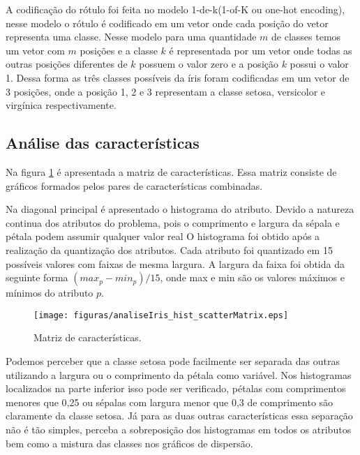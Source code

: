 \documentclass[ 
	article,			%
	11pt,				%
	oneside,			%
	a4paper,			%
	english,			%
	brazil,				%
	]{abntex2}
\begin{document}
A codificação do rótulo foi feita no modelo 1-de-k(1-of-K ou one-hot encoding),
nesse modelo o rótulo é codificado em um vetor onde cada posição do
vetor representa uma classe. Nesse modelo para uma quantidade $m$ de classes
temos um vetor com $m$ posições e a classe $k$ é representada por um vetor
onde todas as outras posições diferentes de $k$ possuem o valor zero e a
posição $k$ possui o valor 1. Dessa forma as três classes possíveis da íris
foram codificadas em um vetor de 3 posições, onde a posição 1, 2 e 3
representam a classe setosa, versicolor e virgínica respectivamente.


\subsection{Análise das características}
\label{ss:analiCara}

Na figura \ref{fig:charMatrix} é apresentada a matriz de características. 
Essa matriz consiste de gráficos formados pelos pares de características
combinadas.

Na diagonal principal é apresentado o histograma do atributo.
Devido a natureza continua dos atributos do problema, pois o
comprimento e largura da sépala e pétala podem assumir qualquer valor real O
histograma foi obtido após a realização da quantização dos atributos.
Cada atributo foi quantizado em 15 possíveis valores com faixas de mesma largura. A
largura da faixa foi obtida da seguinte forma $(max_p - min_p)/15$, onde max e
min são os valores máximos e mínimos do atributo $p$.

\begin{figure}[!htb] \centering
\texttt{[image: figuras/analiseIris\_hist\_scatterMatrix.eps]}
\caption{Matriz de características.}
\label{fig:charMatrix}
\end{figure}

 Podemos perceber que a classe setosa pode facilmente ser separada das outras
 utilizando a largura ou o comprimento da pétala como variável. Nos histogramas
 localizados na parte inferior isso pode ser verificado, pétalas com
 comprimentos menores que 0,25 ou sépalas com largura menor que 0,3 de
 comprimento são claramente da classe setosa.
 Já para as duas outras características essa separação não é tão simples,
 perceba a sobreposição dos histogramas em todos os atributos bem como a mistura
 das classes nos gráficos de dispersão.
 
\end{document}
